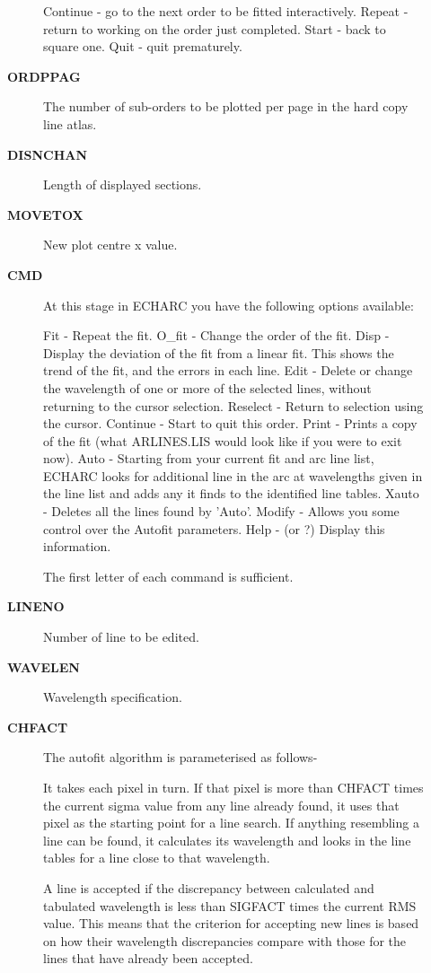 \begin{description}
\begin{description}
   Continue - go to the next order to be fitted interactively.
   Repeat   - return to working on the order just completed.
   Start    - back to square one.
   Quit     - quit prematurely.
\item [{\bf ORDPPAG}]
 The number of sub-orders to be plotted per page in the hard copy
 line atlas.
\item [{\bf DISNCHAN}]
 Length of displayed sections.
\item [{\bf MOVETOX}]
 New plot centre x value.
\item [{\bf CMD}]
 At this stage in ECHARC you have the following options available:

   Fit      - Repeat the fit.
   O_fit    - Change the order of the fit.
   Disp     - Display the deviation of the fit from a linear fit.
              This shows the trend of the fit, and the errors in
              each line.
   Edit     - Delete or change the wavelength of one or more of
              the selected lines, without returning to the cursor
              selection.
   Reselect - Return to selection using the cursor.
   Continue - Start to quit this order.
   Print    - Prints a copy of the fit (what ARLINES.LIS would
              look like if you were to exit now).
   Auto     - Starting from your current fit and arc line list,
              ECHARC looks for additional line in the arc at
              wavelengths given in the line list and adds any it
              finds to the identified line tables.
   Xauto    - Deletes all the lines found by 'Auto'.
   Modify   - Allows you some control over the Autofit parameters.
   Help     - (or ?) Display this information.

 The first letter of each command is sufficient.
\item [{\bf LINENO}]
 Number of line to be edited.
\item [{\bf WAVELEN}]
 Wavelength specification.
\item [{\bf CHFACT}]
 The autofit algorithm is parameterised as follows-

   It takes each pixel in turn.  If that pixel is more than CHFACT
   times the current sigma value from any line already found, it uses
   that pixel as the starting point for a line search.  If anything
   resembling a line can be found, it calculates its wavelength and
   looks in the line tables for a line close to that wavelength.

   A line is accepted if the discrepancy between calculated and
   tabulated wavelength is less than SIGFACT times the current RMS
   value.  This means that the criterion for accepting new lines
   is based on how their wavelength discrepancies compare with those for
   the lines that have already been accepted.


\end{description}
\end{description}
